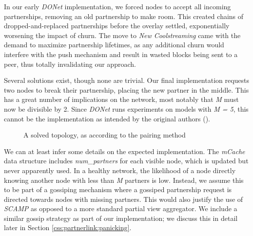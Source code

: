 \documentclass[12pt,a4paper]{article}
\begin{document}
In our early \textit{DONet} implementation, we forced nodes to accept all incoming partnerships, removing an old partnership to make room. This created chains of dropped-and-replaced partnerships before the overlay settled, exponentially worsening the impact of churn. The move to \textit{New Coolstreaming} came with the demand to maximize partnership lifetimes, as any additional churn would interfere with the push mechanism and result in wasted blocks being sent to a peer, thus totally invalidating our approach.

Several solutions exist, though none are trivial. Our final implementation requests two nodes to break their partnership, placing the new partner in the middle. This has a great number of implications on the network, most notably that \textit{M} must now be divisible by 2. Since \textit{DONet} runs experiments on models with \textit{M = 5}, this cannot be the implementation as intended by the original authors (\cite{Zhang2005}).

\begin{figure}[!ht]
	\centering
	\caption{A solved topology, as according to the pairing method}
	\label{fig2}
\end{figure}

We can at least infer some details on the expected implementation. The \textit{mCache} data structure includes \textit{num\_partners} for each visible node, which is updated but never apparently used. In a healthy network, the likelihood of a node directly knowing another node with less than \textit{M} partners is low. Instead, we assume this to be part of a gossiping mechanism where a gossiped partnership request is directed towards nodes with missing partners. This would also justify the use of \textit{SCAMP} as opposed to a more standard partial view aggregator. We include a similar gossip strategy as part of our implementation; we discuss this in detail later in Section \ref{css:partnerlink:panicking}.
\end{document}
